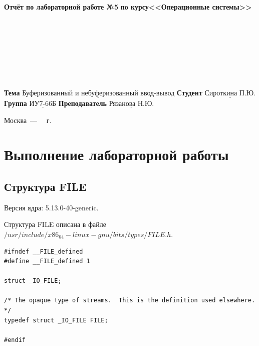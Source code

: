 \documentclass[12pt,a4paper]{scrreprt}
\begin{document}
\begin{titlepage}
		\begin{center}
			\noindent\begin{minipage}{1.3\textwidth}\centering
				\Large\textbf{  Отчёт по лабораторной работе №5}\newline
				\textbf{по курсу}\newline\textbf{<<Операционные системы>>}\newline
			\end{minipage}
		\end{center}
		
		~\\\\\\\\\\\\\\
		\normalsize
		\noindent\textbf{Тема } $\underline{\text{Буферизованный и небуферизованный ввод-вывод}}$\newline\newline
		\noindent\textbf{Студент } $\underline{\text{Сироткина П.Ю.}}$\newline\newline
		\noindent\textbf{Группа } $\underline{\text{ИУ7-66Б}}$\newline\newline
		\noindent\textbf{Преподаватель } $\underline{\text{Рязанова Н.Ю.}}$\newline
		
		\begin{center}
			\vfill
			Москва~---~\the\year
			~г.
		\end{center}
	\end{titlepage}
	
\chapter{Выполнение лабораторной работы}	

\section{Структура FILE}

Версия ядра: 5.13.0-40-generic.

Структура FILE описана в файле $/usr/include/x86_64-linux-gnu/bits/types/FILE.h$.

\begin{lstlisting}[caption=Структура FILE]
#ifndef __FILE_defined
#define __FILE_defined 1

struct _IO_FILE;

/* The opaque type of streams.  This is the definition used elsewhere.  */
typedef struct _IO_FILE FILE;

#endif
\end{lstlisting}
\end{document}
